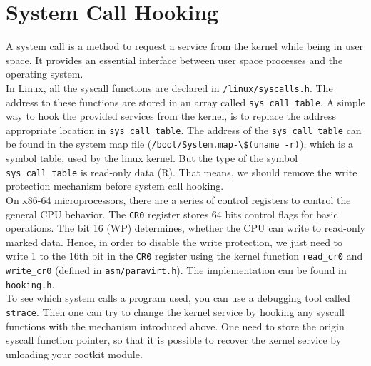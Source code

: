 \section{System Call Hooking}
\label{sec:syscallHooking}
A system call is a method to request a service from the kernel while being in user space. It provides an essential interface between user space processes and the operating system.\\
In Linux, all the syscall functions are declared in \verb+/linux/syscalls.h+. 
The address to these functions are stored in an array called 
\verb+sys_call_table+. 
A simple way to hook the provided services from the kernel, is to replace the 
address appropriate location in \verb+sys_call_table+. The address of the 
\verb+sys_call_table+ can be found in the system map file 
(\verb+/boot/System.map-\$(uname -r)+), which is a symbol table, used by the 
linux kernel. But the type of the symbol \verb+sys_call_table+ is read-only data 
(R). That means, we should remove the write protection mechanism before system 
call hooking.\\
On x86-64 microprocessors, there are a series of control registers to control 
the general CPU behavior. The \texttt{CR0} register stores 64 bits control flags 
for basic operations. The bit 16 (WP) determines, whether the CPU can write to 
read-only marked data. Hence, in order to disable the write protection, we just 
need to write 1 to the 16th bit in the \texttt{CR0} register using the kernel 
function \verb+read_cr0+ and \verb+write_cr0+ (defined in 
\verb+asm/paravirt.h+). The implementation can be found in \verb+hooking.h+.\\
To see which system calls a program used, you can use a debugging tool called \texttt{strace}. Then one can try to change the kernel service by hooking any syscall functions with the mechanism introduced above. One need to store the origin syscall function pointer, so that it is possible to recover the kernel service by unloading your rootkit module. 
